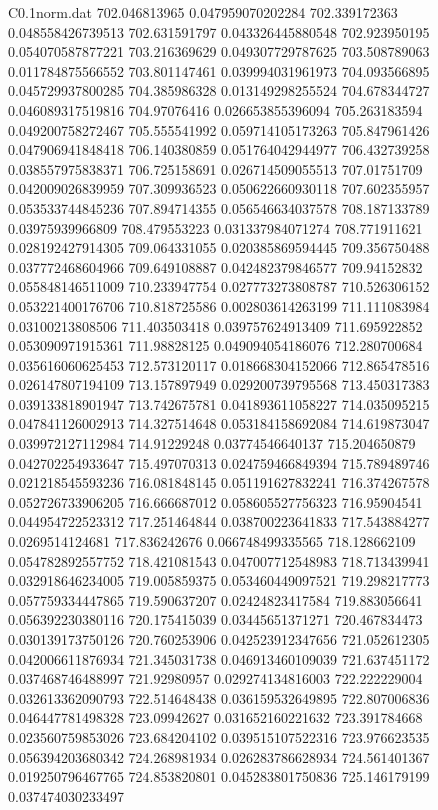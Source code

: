 \begin{filecontents}{C0.1norm.dat}
702.046813965		0.047959070202284
702.339172363		0.048558426739513
702.631591797		0.043326445880548
702.923950195		0.054070587877221
703.216369629		0.049307729787625
703.508789063		0.011784875566552
703.801147461		0.039994031961973
704.093566895		0.045729937800285
704.385986328		0.013149298255524
704.678344727		0.046089317519816
704.97076416		0.026653855396094
705.263183594		0.049200758272467
705.555541992		0.059714105173263
705.847961426		0.047906941848418
706.140380859		0.051764042944977
706.432739258		0.038557975838371
706.725158691		0.026714509055513
707.01751709		0.042009026839959
707.309936523		0.050622660930118
707.602355957		0.053533744845236
707.894714355		0.056546634037578
708.187133789		0.03975939966809
708.479553223		0.031337984071274
708.771911621		0.028192427914305
709.064331055		0.020385869594445
709.356750488		0.037772468604966
709.649108887		0.042482379846577
709.94152832		0.055848146511009
710.233947754		0.027773273808787
710.526306152		0.053221400176706
710.818725586		0.002803614263199
711.111083984		0.03100213808506
711.403503418		0.039757624913409
711.695922852		0.053090971915361
711.98828125		0.049094054186076
712.280700684		0.035616060625453
712.573120117		0.018668304152066
712.865478516		0.026147807194109
713.157897949		0.029200739795568
713.450317383		0.039133818901947
713.742675781		0.041893611058227
714.035095215		0.047841126002913
714.327514648		0.053184158692084
714.619873047		0.039972127112984
714.91229248		0.03774546640137
715.204650879		0.042702254933647
715.497070313		0.024759466849394
715.789489746		0.021218545593236
716.081848145		0.051191627832241
716.374267578		0.052726733906205
716.666687012		0.058605527756323
716.95904541		0.044954722523312
717.251464844		0.038700223641833
717.543884277		0.0269514124681
717.836242676		0.066748499335565
718.128662109		0.054782892557752
718.421081543		0.047007712548983
718.713439941		0.032918646234005
719.005859375		0.053460449097521
719.298217773		0.057759334447865
719.590637207		0.02424823417584
719.883056641		0.056392230380116
720.175415039		0.03445651371271
720.467834473		0.030139173750126
720.760253906		0.042523912347656
721.052612305		0.042006611876934
721.345031738		0.046913460109039
721.637451172		0.037468746488997
721.92980957		0.029274134816003
722.222229004		0.032613362090793
722.514648438		0.036159532649895
722.807006836		0.046447781498328
723.09942627		0.031652160221632
723.391784668		0.023560759853026
723.684204102		0.039515107522316
723.976623535		0.056394203680342
724.268981934		0.026283786628934
724.561401367		0.019250796467765
724.853820801		0.045283801750836
725.146179199		0.037474030233497

\end{filecontents}
